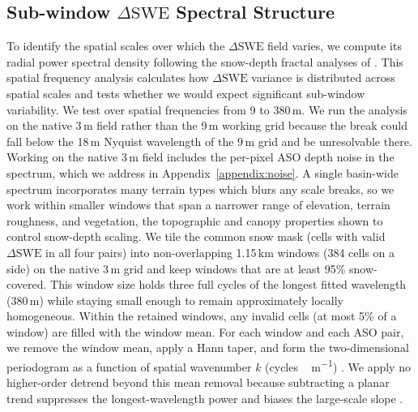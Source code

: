 \documentclass[tc, manuscript]{copernicus}
\begin{document}
\subsection{Sub-window $\Delta\mathrm{SWE}$ Spectral Structure}\label{subsec:psd}

To identify the spatial scales over which the $\Delta\mathrm{SWE}$ field varies, we compute its radial power spectral density following the snow-depth fractal analyses of \citet{trujillo2007topographic-0ec}. This spatial frequency analysis calculates how $\Delta\mathrm{SWE}$ variance is distributed across spatial scales and tests whether we would expect significant sub-window variability. We test over spatial frequencies from 9 to 380\,\unit{m}. We run the analysis on the native 3\,\unit{m} field rather than the 9\,\unit{m} working grid because the break could fall below the 18\,\unit{m} Nyquist wavelength of the 9\,\unit{m} grid and be unresolvable there.  Working on the native 3\,\unit{m} field includes the per-pixel ASO depth noise in the spectrum, which we address in Appendix~\ref{appendix:noise}. A single basin-wide spectrum incorporates many terrain types which blurs any scale breaks, so we work within smaller windows that span a narrower range of elevation, terrain roughness, and vegetation, the topographic and canopy properties shown to control snow-depth scaling. We tile the common snow mask (cells with valid $\Delta\mathrm{SWE}$ in all four pairs) into non-overlapping 1.15\,\unit{km} windows (384 cells on a side) on the native 3\,\unit{m} grid and keep windows that are at least 95\% snow-covered. This window size holds three full cycles of the longest fitted wavelength (380\,\unit{m}) while staying small enough to remain approximately locally homogeneous. Within the retained windows, any invalid cells (at most 5\% of a window) are filled with the window mean. For each window and each ASO pair, we remove the window mean, apply a Hann taper, and form the two-dimensional periodogram as a function of spatial wavenumber $k$ (\unit{cycles\,m^{-1}}) \citep{harris1978use-0d1}. We apply no higher-order detrend beyond this mean removal because subtracting a planar trend suppresses the longest-wavelength power and biases the large-scale slope \citep{deems2006}.
\end{document}

